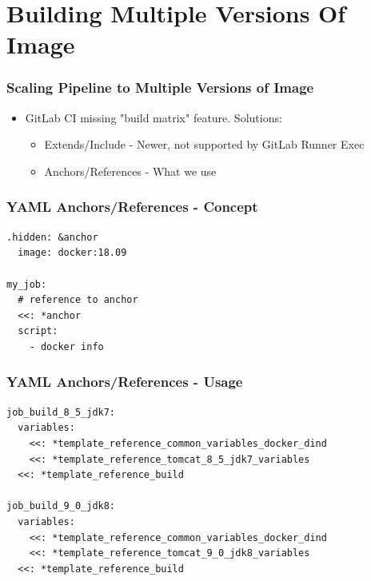 \documentclass[14pt,aspectratio=169]{beamer}
\begin{document}
\section{Building Multiple Versions Of Image}

\begin{frame}[fragile]
  \frametitle{Scaling Pipeline to Multiple Versions of Image}
  \begin{itemize}
    \item GitLab CI missing "build matrix" feature. Solutions:
    \begin{itemize}
      \item Extends/Include - Newer, not supported by GitLab Runner Exec
      \item Anchors/References - What we use
    \end{itemize}
  \end{itemize}
\end{frame}

\begin{frame}[fragile]
  \frametitle{YAML Anchors/References - Concept}
  \begin{verbatim}
.hidden: &anchor
  image: docker:18.09

my_job:
  # reference to anchor
  <<: *anchor
  script:
    - docker info
  \end{verbatim}
\end{frame}

\begin{frame}
  \frametitle{YAML Anchors/References - Usage}

  \begin{verbatim}
job_build_8_5_jdk7:
  variables:
    <<: *template_reference_common_variables_docker_dind
    <<: *template_reference_tomcat_8_5_jdk7_variables
  <<: *template_reference_build

job_build_9_0_jdk8:
  variables:
    <<: *template_reference_common_variables_docker_dind
    <<: *template_reference_tomcat_9_0_jdk8_variables
  <<: *template_reference_build
  \end{verbatim}
\end{frame}

\subsection{}
\end{document}
